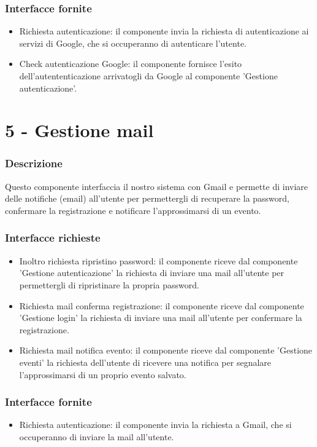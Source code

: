 \documentclass[a4paper,12pt]{article}
\begin{document}
\subsubsection*{Interfacce fornite}
\begin{itemize} \setlength\itemsep{0.01em}
\item {\sffamily Richiesta autenticazione}: il componente invia la richiesta di autenticazione ai servizi di Google, che si occuperanno di autenticare l'utente.
\item {\sffamily Check autenticazione Google}: il componente fornisce l'esito dell'autententicazione arrivatogli da Google al componente 'Gestione autenticazione'.
\end{itemize}



\section*{5 -  Gestione mail}
\subsubsection*{Descrizione}
Questo componente interfaccia il nostro sistema con Gmail e permette di inviare delle notifiche (email) all'utente per permettergli di recuperare la password, confermare la registrazione e notificare l'approssimarsi di un evento. 
\subsubsection*{Interfacce richieste}
\begin{itemize} \setlength\itemsep{0.01em}
\item {\sffamily Inoltro richiesta ripristino password}: il componente riceve dal componente 'Gestione autenticazione' la richiesta di inviare una mail all'utente per permettergli di ripristinare la propria password.
\item {\sffamily Richiesta mail conferma registrazione}: il componente riceve dal componente 'Gestione login' la richiesta di inviare una mail all'utente per confermare la registrazione.
\item {\sffamily Richiesta mail notifica evento}: il componente riceve dal componente 'Gestione eventi' la richiesta dell'utente di ricevere una notifica per segnalare l'approssimarsi di un proprio evento salvato.

\end{itemize}

\subsubsection*{Interfacce fornite}
\begin{itemize} \setlength\itemsep{0.01em}
\item {\sffamily Richiesta autenticazione}: il componente invia la richiesta a Gmail, che si occuperanno di inviare la mail all'utente.
\end{itemize}
\end{document}
